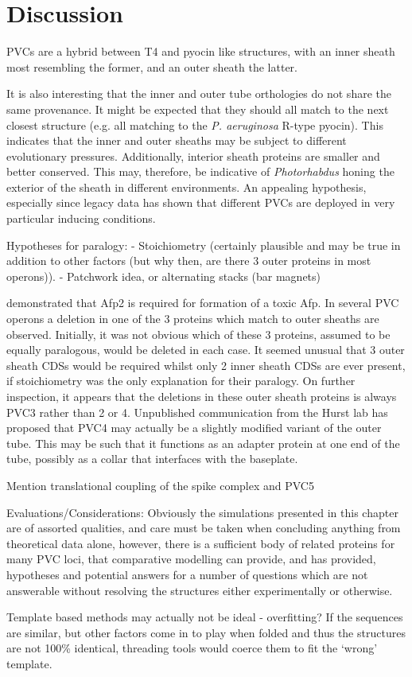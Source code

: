 \section{Discussion}
PVCs are a hybrid between T4 and pyocin like structures, with an inner sheath most resembling the former, and an outer sheath the latter.


It is also interesting that the inner and outer tube orthologies do not share the same provenance. It might be expected that they should all match to the next closest structure (e.g. all matching to the \emph{P. aeruginosa} R-type pyocin). This indicates that the inner and outer sheaths may be subject to different evolutionary pressures. Additionally, interior sheath proteins are smaller and better conserved. This may, therefore, be indicative of \emph{Photorhabdus} honing the exterior of the sheath in different environments. An appealing hypothesis, especially since legacy data has shown that different PVCs are deployed in very particular inducing conditions.

Hypotheses for paralogy:
 - Stoichiometry (certainly plausible and may be true in addition to other factors (but why then, are there 3 outer proteins in most operons)).
 - Patchwork idea, or alternating stacks (bar magnets)


\cite{Hurst2004} demonstrated that Afp2 is required for formation of a toxic Afp. In several PVC operons a deletion in one of the 3 proteins which match to outer sheaths are observed. Initially, it was not obvious which of these 3 proteins, assumed to be equally paralogous, would be deleted in each case. It seemed unusual that 3 outer sheath CDSs would be required whilst only 2 inner sheath CDSs are ever present, if stoichiometry was the only explanation for their paralogy. On further inspection, it appears that the deletions in these outer sheath proteins is always PVC3 rather than 2 or 4. Unpublished communication from the Hurst lab has proposed that PVC4 may actually be a slightly modified variant of the outer tube. This may be such that it functions as an adapter protein at one end of the tube, possibly as a collar that interfaces with the baseplate.

Mention translational coupling of the spike complex and PVC5



Evaluations/Considerations:
Obviously the simulations presented in this chapter are of assorted qualities, and care must be taken when concluding anything from theoretical data alone, however, there is a sufficient body of related proteins for many PVC loci, that comparative modelling can provide, and has provided, hypotheses and potential answers for a number of questions which are not answerable without resolving the structures either experimentally or otherwise.

Template based methods may actually not be ideal - overfitting? If the sequences are similar, but other factors come in to play when folded and thus the structures are not 100\% identical, threading tools would coerce them to fit the `wrong' template.

